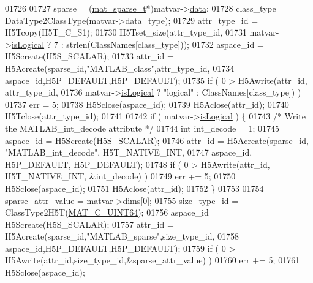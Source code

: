 \begin{DoxyCode}
{{{01726 
01727         sparse = (\hyperlink{group___m_a_t_structmat__sparse__t}{mat\_sparse\_t}*)matvar->\hyperlink{group___m_a_t_a5672978efa230bbdecdf38ede781f7fa}{data};
01728         class\_type = DataType2ClassType(matvar->\hyperlink{group___m_a_t_ab6aafe9bd77f0f077852593dec438144}{data\_type});
01729         attr\_type\_id = H5Tcopy(H5T\_C\_S1);
01730         H5Tset\_size(attr\_type\_id,
01731                     matvar->\hyperlink{group___m_a_t_a866c1539e68073a837833d74cd4a65be}{isLogical} ? 7 : strlen(ClassNames[class\_type]));
01732         aspace\_id = H5Screate(H5S\_SCALAR);
01733         attr\_id = H5Acreate(sparse\_id,\textcolor{stringliteral}{"MATLAB\_class"},attr\_type\_id,
01734                             aspace\_id,H5P\_DEFAULT,H5P\_DEFAULT);
01735         \textcolor{keywordflow}{if} ( 0 > H5Awrite(attr\_id, attr\_type\_id,
01736                           matvar->\hyperlink{group___m_a_t_a866c1539e68073a837833d74cd4a65be}{isLogical} ? \textcolor{stringliteral}{"logical"} : ClassNames[class\_type]) )
01737             err = 5;
01738         H5Sclose(aspace\_id);
01739         H5Aclose(attr\_id);
01740         H5Tclose(attr\_type\_id);
01741 
01742         \textcolor{keywordflow}{if} ( matvar->\hyperlink{group___m_a_t_a866c1539e68073a837833d74cd4a65be}{isLogical} ) \{
01743             \textcolor{comment}{/* Write the MATLAB\_int\_decode attribute */}
01744             \textcolor{keywordtype}{int} int\_decode = 1;
01745             aspace\_id = H5Screate(H5S\_SCALAR);
01746             attr\_id = H5Acreate(sparse\_id, \textcolor{stringliteral}{"MATLAB\_int\_decode"}, H5T\_NATIVE\_INT,
01747                                 aspace\_id, H5P\_DEFAULT, H5P\_DEFAULT);
01748             \textcolor{keywordflow}{if} ( 0 > H5Awrite(attr\_id, H5T\_NATIVE\_INT, &int\_decode) )
01749                 err += 5;
01750             H5Sclose(aspace\_id);
01751             H5Aclose(attr\_id);
01752         \}
01753 
01754         sparse\_attr\_value = matvar->\hyperlink{group___m_a_t_a8e01234e1c862ce3472bb37f5a09b92c}{dims}[0];
01755         size\_type\_id = ClassType2H5T(\hyperlink{group___m_a_t_ggad4d60ae7b709fc81bfd744fb4c857c40a86470e25c3763d9a24623f04326195dd}{MAT\_C\_UINT64});
01756         aspace\_id = H5Screate(H5S\_SCALAR);
01757         attr\_id = H5Acreate(sparse\_id,\textcolor{stringliteral}{"MATLAB\_sparse"},size\_type\_id,
01758                             aspace\_id,H5P\_DEFAULT,H5P\_DEFAULT);
01759         \textcolor{keywordflow}{if} ( 0 > H5Awrite(attr\_id,size\_type\_id,&sparse\_attr\_value) )
01760             err += 5;
01761         H5Sclose(aspace\_id);
}}}
\end{DoxyCode}
